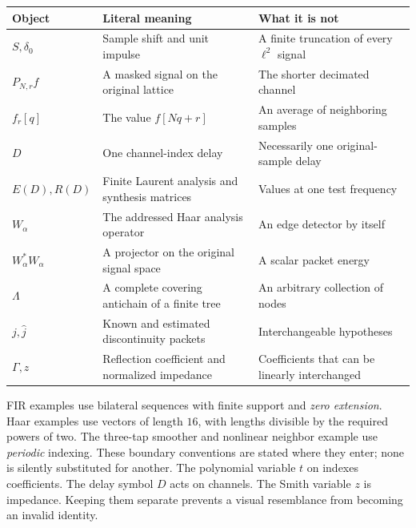 \begin{tabularx}{\linewidth}{@{}p{.17\linewidth}YY@{}}\toprule
Object & Literal meaning & What it is not\\\midrule
$S,\delta_0$ & Sample shift and unit impulse & A finite truncation of every $\ell^2$ signal\\
$P_{N,r}f$ & A masked signal on the original lattice & The shorter decimated channel\\
$f_r[q]$ & The value $f[Nq+r]$ & An average of neighboring samples\\
$D$ & One channel-index delay & Necessarily one original-sample delay\\
$E(D),R(D)$ & Finite Laurent analysis and synthesis matrices & Values at one test frequency\\
$W_\alpha$ & The addressed Haar analysis operator & An edge detector by itself\\
$W_\alpha^*W_\alpha$ & A projector on the original signal space & A scalar packet energy\\
$\Lambda$ & A complete covering antichain of a finite tree & An arbitrary collection of nodes\\
$j,\widehat j$ & Known and estimated discontinuity packets & Interchangeable hypotheses\\
$\Gamma,z$ & Reflection coefficient and normalized impedance & Coefficients that can be linearly interchanged\\\bottomrule
\end{tabularx}
FIR examples use bilateral sequences with finite support and \emph{zero extension}. Haar examples use vectors of length $16$, with lengths divisible by the required powers of two. The three-tap smoother and nonlinear neighbor example use \emph{periodic} indexing. These boundary conventions are stated where they enter; none is silently substituted for another.
The polynomial variable $t$ on  indexes coefficients. The delay symbol $D$ acts on channels. The Smith variable $z$ is impedance. Keeping them separate prevents a visual resemblance from becoming an invalid identity.

